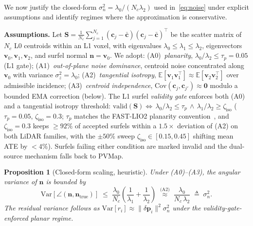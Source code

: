 \documentclass[conference]{IEEEtran}
\newcommand{\bvec}[1]{\mathbf{#1}}
\newtheorem{proposition}{Proposition}
\begin{document}
We now justify the closed-form $\sigma^2_n = \lambda_0/(N_c \lambda_2)$
used in~\eqref{eq:noise} under explicit assumptions and identify
regimes where the approximation is conservative.

\textbf{Assumptions.} Let $\bvec{S} = \frac{1}{N_c}\sum_{j=1}^{N_c}
(\bvec{c}_j - \bar{\bvec{c}})(\bvec{c}_j - \bar{\bvec{c}})^\top$ be
the scatter matrix of $N_c$ L0 centroids within an L1 voxel, with
eigenvalues $\lambda_0 \le \lambda_1 \le \lambda_2$, eigenvectors
$\bvec{v}_0, \bvec{v}_1, \bvec{v}_2$, and surfel normal
$\bvec{n} = \bvec{v}_0$. We adopt:
(A0)~\emph{planarity}, $\lambda_0/\lambda_2 \le \tau_p {=} 0.05$
(L1 gate);
(A1)~\emph{out-of-plane noise dominance}, centroid noise concentrated
along $\bvec{v}_0$ with variance $\sigma_z^2 {=} \lambda_0$;
(A2)~\emph{tangential isotropy},
$\mathbb{E}[\bvec{v}_1\bvec{v}_1^\top] \!\approx\!
\mathbb{E}[\bvec{v}_2\bvec{v}_2^\top]$ over admissible incidence;
(A3)~\emph{centroid independence},
$\mathrm{Cov}(\bvec{c}_j,\bvec{c}_{j'})\!\approx\!\bvec{0}$ modulo a
bounded EMA correction (below). The L1 surfel \emph{validity gate}
enforces both (A0) and a tangential isotropy threshold:
$\mathrm{valid}(\bvec{S}){\Leftrightarrow}\,\lambda_0/\lambda_2{\le}\tau_p
\,{\wedge}\,\lambda_1/\lambda_2{\ge}\zeta_\mathrm{iso}$
($\tau_p{=}0.05$, $\zeta_\mathrm{iso}{=}0.3$; $\tau_p$ matches the
FAST-LIO2 planarity convention~\cite{xu2022fastlio2}, and
$\zeta_\mathrm{iso}{=}0.3$ keeps $\ge\!92\%$ of accepted surfels
within a $1.5{\times}$ deviation of (A2) on both LiDAR families,
with the $\pm 50\%$ sweep $\zeta_\mathrm{iso}\!\in\![0.15,0.45]$
shifting mean ATE by ${<}4\%$). Surfels failing either condition are
marked invalid and the dual-source mechanism falls back to PVMap.

\begin{proposition}[Closed-form scaling, heuristic]\label{prop:sigma2n}
Under (A0)--(A3), the angular variance of $\bvec{n}$ is bounded by
\begin{equation}\label{eq:perturbation}
  \mathrm{Var}[\angle(\bvec{n}, \bvec{n}_\mathrm{true})]
    \;\le\; \frac{\lambda_0}{N_c}\!\left(\!\frac{1}{\lambda_1}\!+\!\frac{1}{\lambda_2}\!\right)
    \;\stackrel{\text{(A2)}}{\approx}\; \frac{\lambda_0}{N_c\,\lambda_2}
    \;\triangleq\; \sigma^2_n.
\end{equation}
The residual variance follows as
$\mathrm{Var}[r_i]\!\approx\!\|\delta\bvec{p}_i\|^2\sigma^2_n$ under
the validity-gate-enforced planar regime.
\end{proposition}
\end{document}

